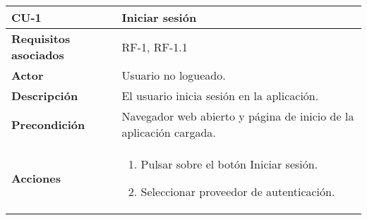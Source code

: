 \begin{longtable}[H]{@{}l|l@{}}
	\toprule
	\begin{minipage}[b]{0.23\columnwidth}\raggedright\strut
		\textbf{CU-1}\strut
	\end{minipage} & \begin{minipage}[b]{0.71\columnwidth}\raggedright\strut
		\textbf{Iniciar sesión}\strut
	\end{minipage}\tabularnewline
	\toprule
	\endhead
	\begin{minipage}[t]{0.23\columnwidth}\raggedright\strut
		\textbf{Requisitos asociados}\strut
	\end{minipage} & \begin{minipage}[t]{0.71\columnwidth}\raggedright\strut
		RF-1, RF-1.1\strut
	\end{minipage}\tabularnewline
	\midrule
	\begin{minipage}[t]{0.23\columnwidth}\raggedright\strut
		\textbf{Actor}\strut
	\end{minipage} & \begin{minipage}[t]{0.71\columnwidth}\raggedright\strut
		Usuario no logueado.\strut
	\end{minipage}\tabularnewline
	\midrule
	\begin{minipage}[t]{0.23\columnwidth}\raggedright\strut
		\textbf{Descripción}\strut
	\end{minipage} & \begin{minipage}[t]{0.71\columnwidth}\raggedright\strut
		El usuario inicia sesión en la aplicación.\strut
	\end{minipage}\tabularnewline
	\midrule
	\begin{minipage}[t]{0.23\columnwidth}\raggedright\strut
		\textbf{Precondición}\strut
	\end{minipage} & \begin{minipage}[t]{0.71\columnwidth}\raggedright\strut
		Navegador web abierto y página de inicio de la aplicación cargada.\strut
	\end{minipage}\tabularnewline
	\midrule
	\begin{minipage}[t]{0.23\columnwidth}\raggedright\strut
		\textbf{Acciones}\strut
	\end{minipage} & \begin{minipage}[t]{0.71\columnwidth}\raggedright\strut
		\begin{enumerate}
			\def\labelenumi{\arabic{enumi}.}
			\tightlist
			\item Pulsar sobre el botón Iniciar sesión.
			\item Seleccionar proveedor de autenticación.

\end{enumerate}
\end{minipage}
\end{longtable}
